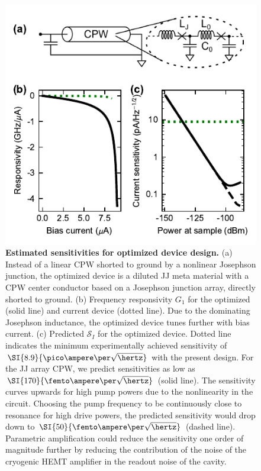 \begin{figure}
	\centering
	\includegraphics[]{chapter-currentdetection/figures/Figure5}
	\caption{
		\textbf{Estimated sensitivities for optimized device design.}
		(a) Instead of a linear CPW shorted to ground by a nonlinear Josephson junction, the optimized device is a diluted JJ meta material with a CPW center conductor based on a Josephson junction array, directly shorted to ground.
		(b) Frequency responsivity $G_1$ for the optimized (solid line) and current device (dotted line).
		Due to the dominating Josephson inductance, the optimized device tunes further with bias current.
		(c) Predicted $\mathcal{S}_I$ for the optimized device.
		Dotted line indicates the minimum experimentally achieved sensitivity of $\SI{8.9}{\pico\ampere\per\sqrt{\hertz}}$ with the present design.
		For the JJ array CPW, we predict sensitivities as low as $\SI{170}{\femto\ampere\per\sqrt{\hertz}}$ (solid line).
		The sensitivity curves upwards for high pump powers due to the nonlinearity in the circuit.
		Choosing the pump frequency to be continuously close to resonance for high drive powers, the predicted sensitivity would drop down to $\SI{50}{\femto\ampere\per\sqrt{\hertz}}$ (dashed line).
		Parametric amplification could reduce the sensitivity one order of magnitude further by reducing the contribution of the noise of the cryogenic HEMT amplifier in the readout noise of the cavity.
		\label{fig:figure5}
	}
\end{figure}

